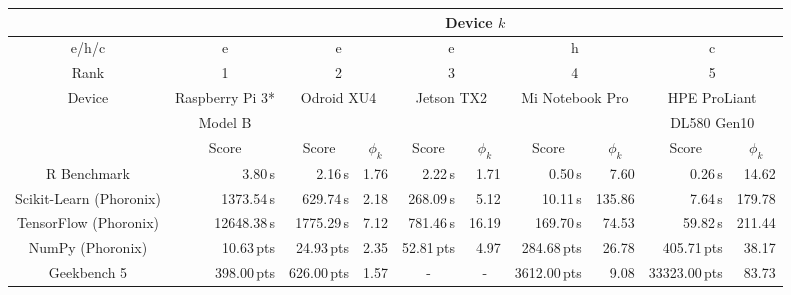 \begin{table}
\centering


\footnotesize
\begin{tabular}{c|r|rr|rr|rr|rr} 
\toprule
 & \multicolumn{9}{c}{Device $k$} \\
\hline
$\mathrm{e}$/$\mathrm{h}$/$\mathrm{c}$ & \multicolumn{1}{c|}{$\mathrm{e}$} & \multicolumn{2}{c|}{$\mathrm{e}$} & \multicolumn{2}{c|}{$\mathrm{e}$} & \multicolumn{2}{c|}{$\mathrm{h}$} & \multicolumn{2}{c}{$\mathrm{c}$}\\

\hline 

Rank                        & \multicolumn{1}{c|}{1}                 & \multicolumn{2}{c|}{2}                 & \multicolumn{2}{c|}{3}                 & \multicolumn{2}{c|}{4}                     & \multicolumn{2}{c}{5}\\

\hline 

\multirow{2}{*}{Device}            &   \multicolumn{1}{c|}{Raspberry Pi 3*}	&   \multicolumn{2}{c|}{\multirow{2}{*}{Odroid XU4}}  				    &   \multicolumn{2}{c|}{\multirow{2}{*}{Jetson TX2}}       		&   \multicolumn{2}{c|}{\multirow{2}{*}{Mi Notebook Pro}}				    &  \multicolumn{2}{c}{HPE ProLiant}\\ 
\multirow{2}{*}{Benchmark} &   \multicolumn{1}{c|}{Model B} & &  & & & & & \multicolumn{2}{c}{DL580 Gen10}		\\
\cline{2-10}

 & \multicolumn{1}{c|}{Score} & \multicolumn{1}{c}{Score} & \multicolumn{1}{c|}{$\phi_{k}$}  & \multicolumn{1}{c}{Score} & \multicolumn{1}{c|}{$\phi_{k}$}  & \multicolumn{1}{c}{Score} & \multicolumn{1}{c|}{$\phi_{k}$}  & \multicolumn{1}{c}{Score} & \multicolumn{1}{c}{$\phi_{k}$}\\
 
\hline


R Benchmark                          & 3.80\,s 	\hspace{10pt}	 & 2.16\,s    	&	1.76		& 2.22\,s    	&	1.71		& 0.50\,s    		&	7.60		&   0.26\,s     &	14.62	\\
Scikit-Learn (Phoronix)              & 1373.54\,s \hspace{10pt}	 & 629.74\,s 	&	2.18		& 268.09\,s 	&	5.12		& 10.11\,s 			&	135.86	&   7.64\,s  	&	179.78	\\
TensorFlow (Phoronix)                & 12648.38\,s \hspace{10pt} & 1775.29\,s    &	7.12		& 781.46\,s 	&	16.19		& 169.70\,s 		&	74.53	&   59.82\,s    &	211.44	\\
NumPy (Phoronix)                     & 10.63\,pts \hspace{10pt}  & 24.93\,pts    &	2.35		& 52.81\,pts    &	4.97		& 284.68\,pts   	&	26.78	&   405.71\,pts &	38.17	\\
Geekbench 5                          & 398.00\,pts \hspace{10pt} & 626.00\,pts  	&	1.57		& \multicolumn{1}{c}{-} 			&	\multicolumn{1}{c|}{-} 			& 3612.00\,pts 		& 	9.08	&   33323.00\,pts  &	83.73	\\


\end{tabular}
\end{table}

